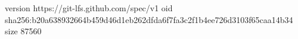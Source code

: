 version https://git-lfs.github.com/spec/v1
oid sha256:b20a638932664b459d46d1eb262dfda6f7fa3c2f1b4ee726d3103f65caa14b34
size 87560
